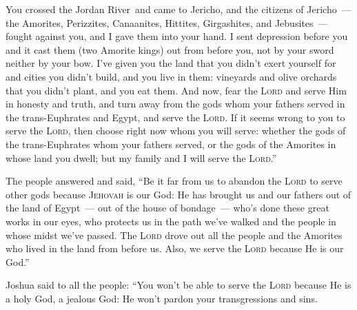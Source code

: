 \begin{inparaenum}
     You crossed the Jordan River\understood\ and came to Jericho, and the citizens of Jericho~--- the Amorites, Perizzites, Canaanites, Hittites, Girgashites, and Jebusites~--- fought against you, and I gave them into your hand.%
     I sent depression before you and it cast them (two Amorite kings) out from before you, not by your sword neither by your bow.%
     I've given you the land that you didn't exert yourself for and cities you didn't build, and you live in them: vineyards and olive orchards that you didn't plant, and you eat them.\understood%
     And now, fear the \textsc{Lord} and serve Him in honesty and truth, and turn away from the gods whom your fathers served in the trans-Euphrates and Egypt, and serve the \textsc{Lord}.%
     If it seems wrong to you to serve the \textsc{Lord}, then choose right now whom you will serve: whether the gods of the trans-Euphrates whom your fathers served, or the gods of the Amorites in whose land you dwell; but my family and I will serve the \textsc{Lord}.''%
    
     The people answered and said, ``Be it far from us to abandon the \textsc{Lord} to serve other gods%
     because \textsc{Jehovah} is our God: He has brought us and our fathers out of the land of Egypt~--- out of the house of bondage~--- who's done these great works in our eyes, who protects us in the path we've walked and the people in whose midst we've passed.%
     The \textsc{Lord} drove out all the people and the Amorites who lived in the land from before us. Also, we serve the \textsc{Lord} because He is our God.''%
    
     Joshua said to all the people: ``You won't be able to serve the \textsc{Lord} because He is a holy God, a jealous God: He won't pardon your transgressions and sins.%
    
    
\end{inparaenum}
